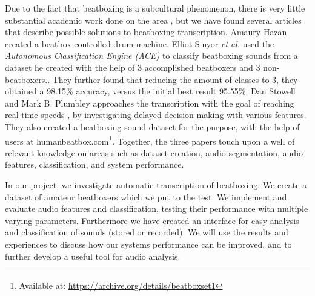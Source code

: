 Due to the fact that beatboxing is a subcultural phenomenon, there is very little substantial academic work done on the area \citep{Stowell2008}, but we have found several articles that describe possible solutions to beatboxing-transcription. Amaury Hazan created a beatbox controlled drum-machine\citep{Hazan2005}. Elliot Sinyor \textit{et al.} used the \textit{Autonomous Classification Engine (ACE)} to classify beatboxing sounds from a dataset he created with the help of 3 accomplished beatboxers and 3 non-beatboxers.\citep{Sinyor05}. They further found that reducing the amount of classes to 3, they obtained a 98.15\% accuracy, versus the initial best result 95.55\%. Dan Stowell and Mark B. Plumbley approaches the transcription with the goal of reaching real-time speeds \citep{Stowell2008}, by investigating delayed decision making with various features. They also created a beatboxing sound dataset for the purpose, with the help of users at humanbeatbox.com\footnote{Available at: \url{https://archive.org/details/beatboxset1}}. Together, the three papers touch upon a well of relevant knowledge on areas such as dataset creation, audio segmentation, audio features,  classification, and system performance.


In our project, we investigate automatic transcription of beatboxing. We create a dataset of amateur beatboxers which we put to the test. We implement and evaluate audio features and classification, testing their performance with multiple varying parameters.
Furthermore we have created an interface for easy analysis and classification of sounds (stored or recorded). We will use the results and experiences to discuss how our systems performance can be improved, and to further develop a useful tool for audio analysis.


